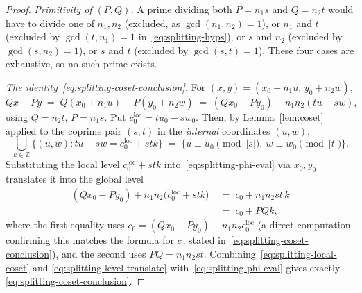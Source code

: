 \documentclass[a4paper,11pt,oneside,reqno]{amsart}
\theoremstyle{definition}
\theoremstyle{remark}
\theoremstyle{plain}
\newcommand{\Z}{\mathbb{Z}}
\begin{document}
\begin{proof}
  \emph{Primitivity of \((P,Q)\).} A prime dividing both \(P=n_1s\) and \(Q=n_2t\) would have to divide
  one of \(n_1,n_2\) (excluded, as \(\gcd(n_1,n_2)=1\)), or \(n_1\) and \(t\) (excluded by \(\gcd(t,n_1)=1\)
  in~\eqref{eq:splitting-hyps}), or \(s\) and \(n_2\) (excluded by \(\gcd(s,n_2)=1\)), or \(s\) and \(t\)
  (excluded by \(\gcd(s,t)=1\)). These four cases are exhaustive, so no such prime exists.

  \emph{The identity~\eqref{eq:splitting-coset-conclusion}.} For \((x,y)=(x_0+n_1u,\,y_0+n_2w)\),
  \begin{equation}
    \label{eq:splitting-phi-eval}
    Qx-Py \;=\; Q(x_0+n_1u) - P(y_0+n_2w) \;=\; (Qx_0-Py_0) + n_1n_2(tu-sw),
  \end{equation}
  using \(Q=n_2t\), \(P=n_1s\). Put \(c_0^{\mathrm{loc}}=tu_0-sw_0\). Then, by Lemma~\ref{lem:coset}
  applied to the coprime pair \((s,t)\) in the \emph{internal} coordinates \((u,w)\),
  \begin{equation}
    \label{eq:splitting-local-coset}
    \bigcup_{k\in\Z}\{(u,w) : tu-sw = c_0^{\mathrm{loc}}+stk\} \;=\; \{u\equiv
    u_0\!\!\pmod{|s|},\ w\equiv w_0\!\!\pmod{|t|}\}.
  \end{equation}
  Substituting the local level \(c_0^{\mathrm{loc}}+stk\) into~\eqref{eq:splitting-phi-eval} via
  \(x_0,y_0\) translates it into the global level
  \begin{equation}
    \label{eq:splitting-level-translate}
    \begin{aligned}
      (Qx_0-Py_0) + n_1n_2\big(c_0^{\mathrm{loc}}+stk\big) \;&=\; c_0 + n_1n_2st\,k \\
      \;&=\; c_0+PQk,
    \end{aligned}
  \end{equation}
  where the first equality uses \(c_0=(Qx_0-Py_0)+n_1n_2c_0^{\mathrm{loc}}\) (a direct computation
  confirming this matches the formula for \(c_0\) stated in~\eqref{eq:splitting-coset-conclusion}),
  and the second uses \(PQ=n_1n_2st\). Combining~\eqref{eq:splitting-local-coset} and
  \eqref{eq:splitting-level-translate} with~\eqref{eq:splitting-phi-eval} gives exactly
  \eqref{eq:splitting-coset-conclusion}.
\end{proof}
\end{document}
